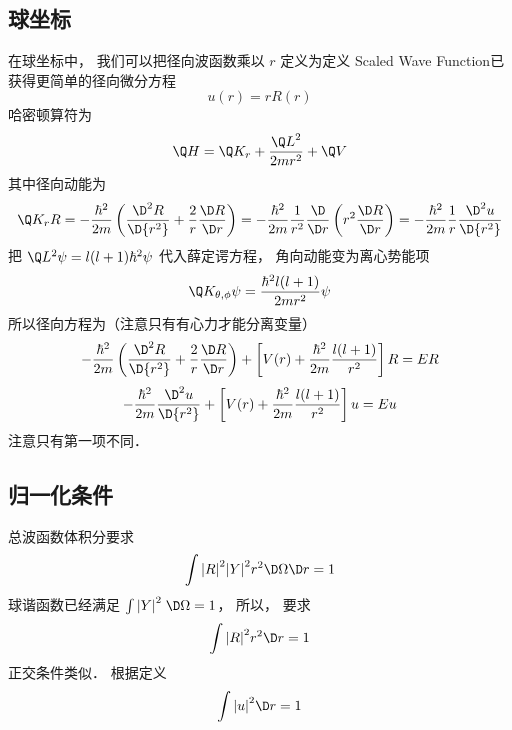 
\subsection{球坐标}

在球坐标中， 我们可以把径向波函数乘以 $r$  定义为定义 Scaled Wave Function已获得更简单的径向微分方程
 \begin{equation}
  u(r) = rR(r)
\end{equation}
哈密顿算符为
 \begin{equation}
  \Q H = {\Q K_r} + \frac{{{{\Q L}^2}}}{{2m{r^2}}} + \Q V
\end{equation}
其中径向动能为
 \begin{equation}
 {\Q K_r}R =  - \frac{{{\hbar ^2}}}{{2m}}\left( {\frac{{{\D ^2}R}}{{\D {r^2}}} + \frac{2}{r}\frac{{\D R}}{{\D r}}} \right) =  - \frac{{{\hbar ^2}}}{{2m}}\frac{1}{{{r^2}}}\frac{\D }{{\D r}}\left( {{r^2}\frac{{\D R}}{{\D r}}} \right) =  - \frac{{{\hbar ^2}}}{{2m}}\frac{1}{r}\frac{{{\D ^2}u}}{{\D {r^2}}}
\end{equation}
把 ${\Q L^2}\psi  = l(l + 1){\hbar ^2}\psi $  代入薛定谔方程， 角向动能变为离心势能项
 \begin{equation}
{\Q K_{\theta ,\phi }}\psi  = \frac{{{\hbar ^2}l(l + 1)}}{{2m{r^2}}}\psi 
\end{equation}
所以径向方程为（注意只有有心力才能分离变量）
 \begin{equation}
  - \frac{{{\hbar ^2}}}{{2m}}\left( {\frac{{{\D ^2}R}}{{\D {r^2}}} + \frac{2}{r}\frac{{\D R}}{{\D r}}} \right) + \left[ {V(r) + \frac{{{\hbar ^2}}}{{2m}}\frac{{l(l + 1)}}{{{r^2}}}} \right]R = ER
\end{equation}
 \begin{equation}
   - \frac{{{\hbar ^2}}}{{2m}}\frac{{{\D ^2}u}}{{\D {r^2}}} + \left[ {V(r) + \frac{{{\hbar ^2}}}{{2m}}\frac{{l(l + 1)}}{{{r^2}}}} \right]u = Eu
\end{equation}
注意只有第一项不同．


\subsection{归一化条件}

总波函数体积分要求
 \begin{equation}
  \int {{{\left| R \right|}^2}{{\left| Y \right|}^2}{r^2}\D \Omega \D r}  = 1
\end{equation}
球谐函数已经满足 $\int {{{\left| Y \right|}^2}\;\D \Omega }  = 1$，  所以， 要求
 \begin{equation}
  \int {{{\left| R \right|}^2}{r^2}\D r}  = 1
\end{equation}
正交条件类似． 根据定义
 \begin{equation}
  \int {{{\left| u \right|}^2}\D r}  = 1
\end{equation}


